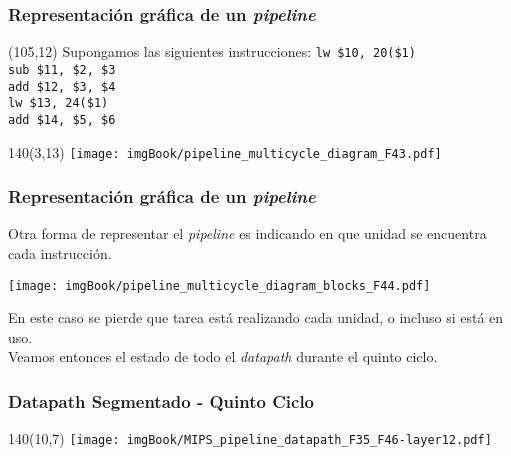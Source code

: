 \documentclass[aspectratio=169]{beamer}
\begin{document}
\begin{frame}[t,fragile]
    \frametitle{Representación gráfica de un \emph{pipeline}}
    \begin{textblock}{50}(105,12)
    \small
    Supongamos las siguientes instrucciones:
    \bigskip
    \footnotesize
    \texttt{lw \$10, 20(\$1)}\\
    \texttt{sub \$11, \$2, \$3}\\
    \texttt{add \$12, \$3, \$4}\\
    \texttt{lw \$13, 24(\$1)}\\
    \texttt{add \$14, \$5, \$6}\\
    \bigskip
    \small
    \bigskip
    \end{textblock}
    \begin{textblock}{140}(3,13)
\texttt{[image: imgBook/pipeline\_multicycle\_diagram\_F43.pdf]}
    \end{textblock}
\end{frame}

\begin{frame}[t,fragile]
    \frametitle{Representación gráfica de un \emph{pipeline}}
    Otra forma de representar el \emph{pipeline} es indicando en que unidad se encuentra cada instrucción.
    \begin{center}
    \texttt{[image: imgBook/pipeline\_multicycle\_diagram\_blocks\_F44.pdf]}
    \end{center}
    \pause
    \textcolor{verdeuca}{En este caso se pierde que tarea está realizando cada unidad, o incluso si está en uso.}\\
    \vspace{0.2cm}
    \textcolor{naranjauca}{Veamos entonces el estado de todo el \emph{datapath} durante el quinto ciclo.}
\end{frame}

\begin{frame}[t,fragile]
    \frametitle{Datapath Segmentado - Quinto Ciclo}
    \begin{textblock}{140}(10,7) \texttt{[image: imgBook/MIPS\_pipeline\_datapath\_F35\_F46-layer12.pdf]} \end{textblock}
\end{frame}
\end{document}
